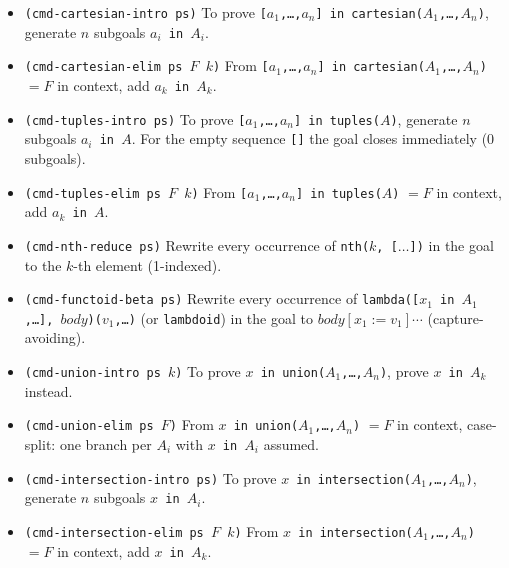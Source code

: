 \begin{itemize}

\item \begin{sloppypar}\texttt{(cmd-cartesian-intro ps)}
  To prove \texttt{[$a_1$,\ldots,$a_n$] in cartesian($A_1$,\ldots,$A_n$)},
  generate $n$ subgoals \texttt{$a_i$ in $A_i$}.\end{sloppypar}

\item \begin{sloppypar}\texttt{(cmd-cartesian-elim ps $F$\ $k$)}
  From \texttt{[$a_1$,\ldots,$a_n$] in cartesian($A_1$,\ldots,$A_n$)} $= F$
  in context, add \texttt{$a_k$ in $A_k$}.\end{sloppypar}

\item \texttt{(cmd-tuples-intro ps)}
  To prove \texttt{[$a_1$,\ldots,$a_n$] in tuples($A$)},
  generate $n$ subgoals \texttt{$a_i$ in $A$}.
  For the empty sequence \texttt{[]} the goal closes immediately (0 subgoals).

\item \begin{sloppypar}\texttt{(cmd-tuples-elim ps $F$\ $k$)}
  From \texttt{[$a_1$,\ldots,$a_n$] in tuples($A$)} $= F$
  in context, add \texttt{$a_k$ in $A$}.\end{sloppypar}

\item \texttt{(cmd-nth-reduce ps)}
  Rewrite every occurrence of \texttt{nth($k$, [$\ldots$])} in the goal to
  the $k$-th element (1-indexed).

\item \begin{sloppypar}\texttt{(cmd-functoid-beta ps)}
  Rewrite every occurrence of
  \texttt{lambda([$x_1$ in $A_1$,\ldots], $\mathit{body}$)($v_1$,\ldots)}
  (or \texttt{lambdoid}) in the goal to
  $\mathit{body}[x_1 := v_1]\cdots$ (capture-avoiding).\end{sloppypar}

\item \texttt{(cmd-union-intro ps $k$)}
  To prove \texttt{$x$ in union($A_1$,\ldots,$A_n$)},
  prove \texttt{$x$ in $A_k$} instead.

\item \texttt{(cmd-union-elim ps $F$)}
  From \texttt{$x$ in union($A_1$,\ldots,$A_n$)} $= F$ in context,
  case-split: one branch per $A_i$ with \texttt{$x$ in $A_i$} assumed.

\item \begin{sloppypar}\texttt{(cmd-intersection-intro ps)}
  To prove \texttt{$x$ in intersection($A_1$,\ldots,$A_n$)},
  generate $n$ subgoals \texttt{$x$ in $A_i$}.\end{sloppypar}

\item \begin{sloppypar}\texttt{(cmd-intersection-elim ps $F$\ $k$)}
  From \texttt{$x$ in intersection($A_1$,\ldots,$A_n$)} $= F$ in context,
  add \texttt{$x$ in $A_k$}.\end{sloppypar}

\end{itemize}

